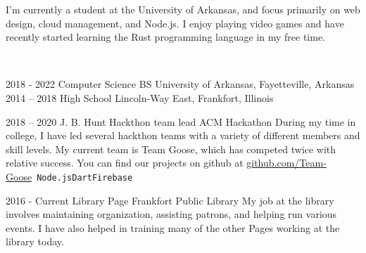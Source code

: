 \documentclass[9pt]{developercv} %
\begin{document}
	\begin{minipage}[t]{0.35\textwidth}
		\vspace{-\baselineskip} %

		I'm currently a student at the University of Arkansas, and focus primarily on web design, cloud management, and Node.js. I enjoy playing video games and have recently started learning the Rust programming language in my free time.

	\end{minipage}
	\hfill %
	\begin{minipage}[t]{0.6\textwidth} %
		\vspace{-\baselineskip} %
		\vspace{.2cm}\\
	\end{minipage}

\vspace{-6pt}



\begin{entrylist}
	\entry
		{2018 - 2022}
		{Computer Science BS}
		{}
		{University of Arkansas, Fayetteville, Arkansas}
	\entry
		{2014 -- 2018}
		{High School}
		{}
		{Lincoln-Way East, Frankfort, Illinois}
\end{entrylist}


\begin{entrylist}
	\entry
		{2018 -- 2020}
		{J. B. Hunt Hackthon team lead}
		{ACM Hackathon}
		{During my time in college, I have led several hackthon teams with a variety of different members and skill levels. My current team is Team Goose, which has competed twice with relative success. You can find our projects on github at \href{https://github.com/Team-Goose}{github.com/Team-Goose}\
		\newline\texttt{Node.js}\slashsep\texttt{Dart}\slashsep\texttt{Firebase}}
\end{entrylist}

\begin{entrylist}
	\entry
		{2016 - Current}
		{Library Page}
		{Frankfort Public Library}
		{My job at the library involves maintaining organization, assisting patrons, and helping run various events. I have also helped in training many of the other Pages working at the library today.}\
\end{entrylist}
\end{document}

